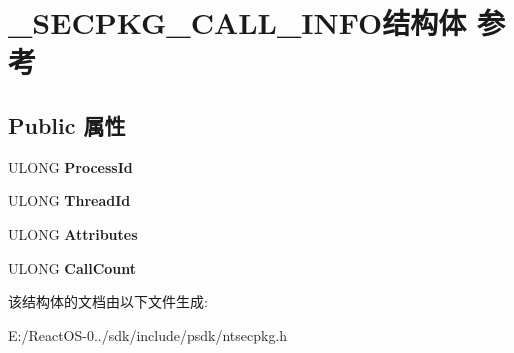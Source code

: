 \hypertarget{struct___s_e_c_p_k_g___c_a_l_l___i_n_f_o}{}\section{\+\_\+\+S\+E\+C\+P\+K\+G\+\_\+\+C\+A\+L\+L\+\_\+\+I\+N\+F\+O结构体 参考}
\label{struct___s_e_c_p_k_g___c_a_l_l___i_n_f_o}
\subsection*{Public 属性}
\begin{DoxyCompactItemize}
\item 
\mbox{\label{struct___s_e_c_p_k_g___c_a_l_l___i_n_f_o_afb8d7d9e84d19b17e4d72cf7bf13a8fc}} 
U\+L\+O\+NG {\bfseries Process\+Id}
\item 
\mbox{\label{struct___s_e_c_p_k_g___c_a_l_l___i_n_f_o_a248c166bcff6dca5f17d6b1ff22df39f}} 
U\+L\+O\+NG {\bfseries Thread\+Id}
\item 
\mbox{\label{struct___s_e_c_p_k_g___c_a_l_l___i_n_f_o_a22f1356658c469ef5a014d1c7647c2d7}} 
U\+L\+O\+NG {\bfseries Attributes}
\item 
\mbox{\label{struct___s_e_c_p_k_g___c_a_l_l___i_n_f_o_a8254257bb7c3fea844ee11617888a1c3}} 
U\+L\+O\+NG {\bfseries Call\+Count}
\end{DoxyCompactItemize}


该结构体的文档由以下文件生成\+:\begin{DoxyCompactItemize}
\item 
E\+:/\+React\+O\+S-\/0../sdk/include/psdk/ntsecpkg.\+h\end{DoxyCompactItemize}
